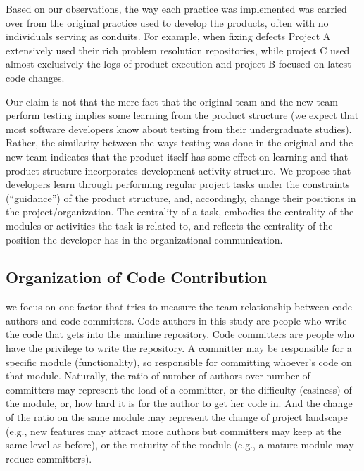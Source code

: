 \documentclass{sig-alternate-05-2015}
\begin{document}
Based on our observations, the way each practice was implemented was carried 
over from the original practice used to develop the products, often with no 
individuals serving as conduits. For example, when fixing defects Project A 
extensively used their rich problem resolution repositories, while project C 
used almost exclusively the logs of product execution and project B focused 
on latest code changes. 

Our claim is not that the mere fact that the original team and the new team 
perform testing implies some learning from the product structure (we expect 
that most software developers know about testing from their undergraduate 
studies). Rather, the similarity between the ways testing was done in the 
original and the new team indicates that the product itself has some effect 
on learning and that product structure incorporates development activity 
structure.
We propose that developers learn through performing regular project tasks 
under the constraints (``guidance'') of the product structure, and, accordingly, 
change their positions in the project/organization. The centrality of a task, 
embodies the centrality of the modules or activities the task is related to, 
and reflects the centrality of the position the developer has in the 
organizational communication.


\subsection{Organization of Code Contribution} %
we focus on one factor that tries to measure the team relationship between
code authors and code committers. Code authors in this study are people who
write the code that gets into the mainline repository. Code committers are
people who have the privilege to write the repository. A committer may be
responsible for a specific module (functionality), so responsible for committing
whoever's code on that module. 
Naturally, the ratio
of number of authors over number of committers may represent the load of a committer,
or the difficulty (easiness) of the module, or, how hard it is for the author to 
get her code in. And the change of the ratio on the same module may represent
the change of project landscape (e.g., new features may attract more authors but
committers may keep at the same level as before), or the maturity of the module (e.g.,
a mature module may reduce committers). 
\end{document}
